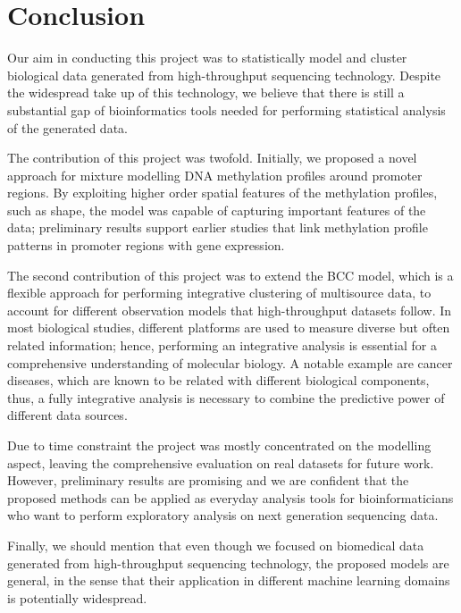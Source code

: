 \chapter{Conclusion} \label{conclusion-chapter}
Our aim in conducting this project was to statistically model and cluster biological data generated from high-throughput sequencing technology. Despite the widespread take up of this technology, we believe that there is still a substantial gap of bioinformatics tools needed for performing statistical analysis of the generated data.

The contribution of this project was twofold. Initially, we proposed a novel approach for mixture modelling DNA methylation profiles around promoter regions. By exploiting higher order spatial features of the methylation profiles, such as shape, the model was capable of capturing important features of the data; preliminary results support earlier studies that link methylation profile patterns in promoter regions with gene expression. 

The second contribution of this project was to extend the BCC model, which is a flexible approach for performing integrative clustering of multisource data, to account for different observation models that high-throughput datasets follow. In most biological studies, different platforms are used to measure diverse but often related information; hence, performing an integrative analysis is essential for a comprehensive understanding of molecular biology. A notable example are cancer diseases, which are known to be related with different biological components, thus, a fully integrative analysis is necessary to combine the predictive power of different data sources.  

Due to time constraint the project was mostly concentrated on the modelling aspect, leaving the comprehensive evaluation on real datasets for future work. However, preliminary results are promising and we are confident that the proposed methods can be applied as everyday analysis tools for bioinformaticians who want to perform exploratory analysis on next generation sequencing data.

Finally, we should mention that even though we focused on biomedical data generated from high-throughput sequencing technology, the proposed models are general, in the sense that their application in different machine learning domains is potentially widespread. 

